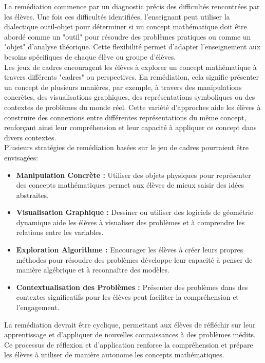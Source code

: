 La remédiation commence par un diagnostic précis des difficultés rencontrées par les élèves.
Une fois ces difficultés identifiées,
l'enseignant peut utiliser la dialectique outil-objet pour déterminer si un concept mathématique doit être abordé comme un "outil" pour résoudre des problèmes pratiques ou comme un "objet" d'analyse théorique.
Cette flexibilité permet d'adapter l'enseignement aux besoins spécifiques de chaque élève ou groupe d'élèves.\\

Les jeux de cadres encouragent les élèves à explorer un concept mathématique à travers différents "cadres" ou perspectives.
En remédiation,
cela signifie présenter un concept de plusieurs manières,
par exemple,
à travers des manipulations concrètes,
des visualisations graphiques,
des représentations symboliques ou des contextes de problèmes du monde réel.
Cette variété d'approches aide les élèves à construire des connexions entre différentes représentations du même concept,
renforçant ainsi leur compréhension et leur capacité à appliquer ce concept dans divers contextes.\\

Plusieurs stratégies de remédiation basées sur le jeu de cadres pourraient être envisagées:
\begin{itemize}%
    \item \textbf{Manipulation Concrète :}
    Utiliser des objets physiques pour représenter des concepts mathématiques permet aux élèves de mieux saisir des idées abstraites.

    \item \textbf{Visualisation Graphique :}
    Dessiner ou utiliser des logiciels de géométrie dynamique aide les élèves à visualiser des problèmes et à comprendre les relations entre les variables.
    
    \item \textbf{Exploration Algorithme :}
    Encourager les élèves à créer leurs propres méthodes pour résoudre des problèmes développe leur capacité à penser de manière algébrique et à reconnaître des modèles.
    
    \item \textbf{Contextualisation des Problèmes :}
    Présenter des problèmes dans des contextes significatifs pour les élèves peut faciliter la compréhension et l'engagement.
\end{itemize}%

La remédiation devrait être cyclique,
permettant aux élèves de réfléchir sur leur apprentissage et d'appliquer de nouvelles connaissances à des problèmes inédits.
Ce processus de réflexion et d'application renforce la compréhension et prépare les élèves à utiliser de manière autonome les concepts mathématiques.

